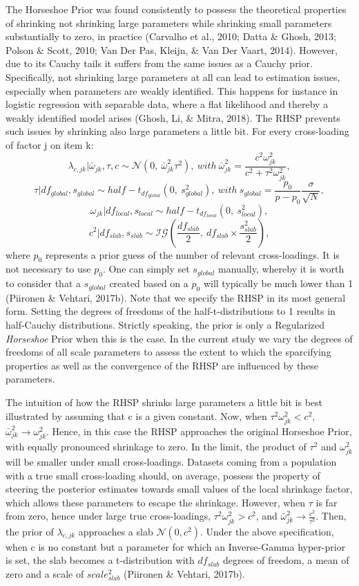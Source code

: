 \documentclass[
  english,
  man, donotrepeattitle,floatsintext]{apa6}
\begin{document}
The Horseshoe Prior was found consistently to possess the theoretical properties of shrinking not shrinking large parameters while shrinking small parameters substantially to zero, in practice (Carvalho et al., 2010; Datta \& Ghosh, 2013; Polson \& Scott, 2010; Van Der Pas, Kleijn, \& Van Der Vaart, 2014). However, due to its Cauchy tails it suffers from the same issues as a Cauchy prior. Specifically, not shrinking large parameters at all can lead to estimation issues, especially when parameters are weakly identified. This happens for instance in logistic regression with separable data, where a flat likelihood and thereby a weakly identified model arises (Ghosh, Li, \& Mitra, 2018). The RHSP prevents such issues by shrinking also large parameters a little bit. For every cross-loading of factor j on item k:
\[\lambda_{c,jk} | \bar{\omega}_{jk}, \tau, c\sim \mathcal{N}(0, \ \bar{\omega}^2_{jk} \tau^2), \ with \ \bar{\omega}^2_{jk} = \frac{c^2\omega_{jk}^2}{c^2 + \tau^2 \omega_{jk}^2},\]
\[\tau | df_{global}, s_{global} \sim half-t_{df_{global}}(0,\  s_{global}^2), \ with \  s_{global} = \frac{p_0}{p-p_0}\frac{\sigma}{\sqrt{N}},\]
\[\omega_{jk}| df_{local}, s_{local} \sim half-t_{df_{local}}(0, \ s_{local}^2),\]
\[c^2 | df_{slab}, s_{slab} \sim \mathcal{IG}(\frac{df_{slab}}{2}, \  df_{slab} \times \frac{s_{slab}^2}{2}),\]
where \(p_0\) represents a prior guess of the number of relevant cross-loadings. It is not necessary to use \(p_0\). One can simply set \(s_{global}\) manually, whereby it is worth to consider that a \(s_{global}\) created based on a \(p_0\) will typically be much lower than 1 (Piironen \& Vehtari, 2017b). Note that we specify the RHSP in its most general form. Setting the degrees of freedoms of the half-t-distributions to 1 results in half-Cauchy distributions. Strictly speaking, the prior is only a Regularized \emph{Horseshoe} Prior when this is the case. In the current study we vary the degrees of freedoms of all scale parameters to assess the extent to which the sparcifying properties as well as the convergence of the RHSP are influenced by these parameters.

The intuition of how the RHSP shrinks large parameters a little bit is best illustrated by assuming that c is a given constant. Now, when \(\tau^2 \omega^2_{jk} < c^2\), \(\bar{\omega}^2_{jk} \to \omega^2_{jk}\). Hence, in this case the RHSP approaches the original Horseshoe Prior, with equally pronounced shrinkage to zero. In the limit, the product of \(\tau^2\) and \(\omega^2_{jk}\) will be smaller under small cross-loadings. Datasets coming from a population with a true small cross-loading should, on average, possess the property of steering the posterior estimates towards small values of the local shrinkage factor, which allows these parameters to escape the shrinkage. However, when \(\tau\) is far from zero, hence under large true cross-loadings, \(\tau^2 \omega^2_{jk} > c^2\), and \(\bar{\omega}^2_{jk} \to \frac{c^2}{\tau^2}\). Then, the prior of \(\lambda_{c,jk}\) approaches a slab \(\mathcal{N}(0, c^2)\). Under the above specification, when c is no constant but a parameter for which an Inverse-Gamma hyper-prior is set, the slab becomes a t-distribution with \(df_{slab}\) degrees of freedom, a mean of zero and a scale of \(scale_{slab}^2\) (Piironen \& Vehtari, 2017b).
\end{document}

